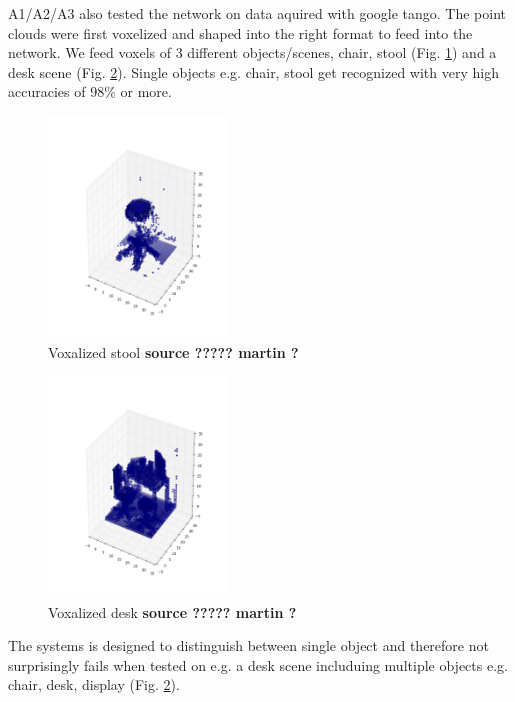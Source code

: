 \documentclass[10pt,twocolumn,letterpaper]{article}
\begin{document}
\vspace{0.3cm}
A1/A2/A3 also tested the network on data aquired with google tango. The point clouds were first voxelized
and shaped into the right format to feed into the network. We feed voxels of 3 different objects/scenes, chair, 
stool (Fig. \ref{fig:voxel_stool}) and a desk scene (Fig. \ref{fig:desk}). Single objects e.g. chair, stool get recognized with very high accuracies of 98\% or more.

\begin{figure}[h]
	\label{fig:voxel_stool}
	\centering
	\includegraphics[width=0.42\textwidth]{figures/tango_voxel_stool}
	\caption{Voxalized stool \textbf{ source ????? martin ?}}
\end{figure}

\begin{figure}[h]
	\label{fig:desk}
	\centering
	\includegraphics[width=0.42\textwidth]{figures/tango_voxel_desk_scene}
	\caption{Voxalized desk \textbf{source ????? martin ?}}
\end{figure}

The systems is designed to distinguish between single object and therefore not surprisingly fails when
tested on e.g. a desk scene includuing multiple objects e.g. chair, desk, display (Fig. \ref{fig:desk}).
\end{document}
